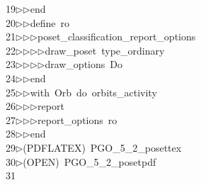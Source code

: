 \begin{tabbing}
19\>$\triangleright$\>$\triangleright$\>end\ \\[0pt]
20\>$\triangleright$\>$\triangleright$\>define\ ro\ \\[0pt]
21\>$\triangleright$\>$\triangleright$\>$\triangleright$\>poset\_classification\_report\_options\ \\[0pt]
22\>$\triangleright$\>$\triangleright$\>$\triangleright$\>$\triangleright$\>draw\_poset\ type\_ordinary\ \\[0pt]
23\>$\triangleright$\>$\triangleright$\>$\triangleright$\>$\triangleright$\>draw\_options\ Do\ \\[0pt]
24\>$\triangleright$\>$\triangleright$\>end\ \\[0pt]
25\>$\triangleright$\>$\triangleright$\>with\ Orb\ do\ orbits\_activity\ \\[0pt]
26\>$\triangleright$\>$\triangleright$\>$\triangleright$\>report\ \ \\[0pt]
27\>$\triangleright$\>$\triangleright$\>$\triangleright$\>report\_options\ ro\ \\[0pt]
28\>$\triangleright$\>$\triangleright$\>end\ \\[0pt]
29\>$\triangleright$\>(PDFLATEX)\ PGO\_5\_2\_posettex\\[0pt]
30\>$\triangleright$\>(OPEN)\ PGO\_5\_2\_posetpdf\\[0pt]
31\>\end{tabbing}
